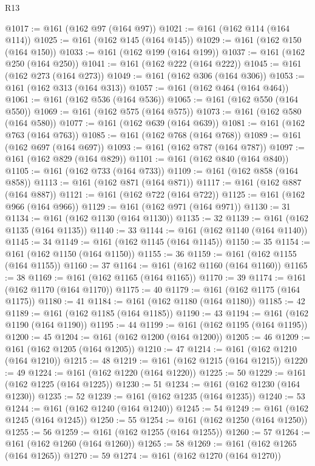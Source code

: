 \begin{lexlean}{R13}
\begin{coremodule}
@1017 := @161 (@162 @97 (@164 @97))
@1021 := @161 (@162 @114 (@164 @114))
@1025 := @161 (@162 @145 (@164 @145))
@1029 := @161 (@162 @150 (@164 @150))
@1033 := @161 (@162 @199 (@164 @199))
@1037 := @161 (@162 @250 (@164 @250))
@1041 := @161 (@162 @222 (@164 @222))
@1045 := @161 (@162 @273 (@164 @273))
@1049 := @161 (@162 @306 (@164 @306))
@1053 := @161 (@162 @313 (@164 @313))
@1057 := @161 (@162 @464 (@164 @464))
@1061 := @161 (@162 @536 (@164 @536))
@1065 := @161 (@162 @550 (@164 @550))
@1069 := @161 (@162 @575 (@164 @575))
@1073 := @161 (@162 @580 (@164 @580))
@1077 := @161 (@162 @639 (@164 @639))
@1081 := @161 (@162 @763 (@164 @763))
@1085 := @161 (@162 @768 (@164 @768))
@1089 := @161 (@162 @697 (@164 @697))
@1093 := @161 (@162 @787 (@164 @787))
@1097 := @161 (@162 @829 (@164 @829))
@1101 := @161 (@162 @840 (@164 @840))
@1105 := @161 (@162 @733 (@164 @733))
@1109 := @161 (@162 @858 (@164 @858))
@1113 := @161 (@162 @871 (@164 @871))
@1117 := @161 (@162 @887 (@164 @887))
@1121 := @161 (@162 @722 (@164 @722))
@1125 := @161 (@162 @966 (@164 @966))
@1129 := @161 (@162 @971 (@164 @971))
@1130 := 31
@1134 := @161 (@162 @1130 (@164 @1130))
@1135 := 32
@1139 := @161 (@162 @1135 (@164 @1135))
@1140 := 33
@1144 := @161 (@162 @1140 (@164 @1140))
@1145 := 34
@1149 := @161 (@162 @1145 (@164 @1145))
@1150 := 35
@1154 := @161 (@162 @1150 (@164 @1150))
@1155 := 36
@1159 := @161 (@162 @1155 (@164 @1155))
@1160 := 37
@1164 := @161 (@162 @1160 (@164 @1160))
@1165 := 38
@1169 := @161 (@162 @1165 (@164 @1165))
@1170 := 39
@1174 := @161 (@162 @1170 (@164 @1170))
@1175 := 40
@1179 := @161 (@162 @1175 (@164 @1175))
@1180 := 41
@1184 := @161 (@162 @1180 (@164 @1180))
@1185 := 42
@1189 := @161 (@162 @1185 (@164 @1185))
@1190 := 43
@1194 := @161 (@162 @1190 (@164 @1190))
@1195 := 44
@1199 := @161 (@162 @1195 (@164 @1195))
@1200 := 45
@1204 := @161 (@162 @1200 (@164 @1200))
@1205 := 46
@1209 := @161 (@162 @1205 (@164 @1205))
@1210 := 47
@1214 := @161 (@162 @1210 (@164 @1210))
@1215 := 48
@1219 := @161 (@162 @1215 (@164 @1215))
@1220 := 49
@1224 := @161 (@162 @1220 (@164 @1220))
@1225 := 50
@1229 := @161 (@162 @1225 (@164 @1225))
@1230 := 51
@1234 := @161 (@162 @1230 (@164 @1230))
@1235 := 52
@1239 := @161 (@162 @1235 (@164 @1235))
@1240 := 53
@1244 := @161 (@162 @1240 (@164 @1240))
@1245 := 54
@1249 := @161 (@162 @1245 (@164 @1245))
@1250 := 55
@1254 := @161 (@162 @1250 (@164 @1250))
@1255 := 56
@1259 := @161 (@162 @1255 (@164 @1255))
@1260 := 57
@1264 := @161 (@162 @1260 (@164 @1260))
@1265 := 58
@1269 := @161 (@162 @1265 (@164 @1265))
@1270 := 59
@1274 := @161 (@162 @1270 (@164 @1270))

\end{coremodule}
\end{lexlean}

